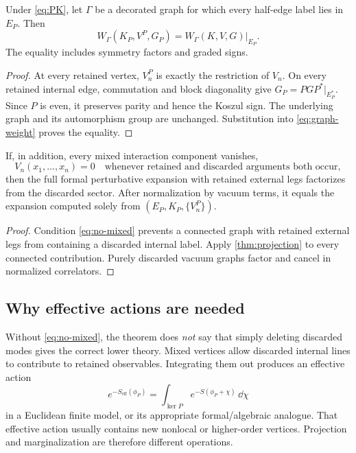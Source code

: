 \documentclass[11pt,a4paper]{article}
\begin{document}
\begin{theorem}
\label{thm:projection}
Under \eqref{eq:PK}, let \(\Gamma\) be a decorated graph for which every
half-edge label lies in \(E_P\).  Then
\[
 W_\Gamma(K_P,V^P,G_P)
 =
 W_\Gamma(K,V,G)\big|_{E_P}.
\]
The equality includes symmetry factors and graded signs.
\end{theorem}

\begin{proof}
At every retained vertex, \(V_n^P\) is exactly the restriction of \(V_n\).
On every retained internal edge, commutation and block diagonality give
\(G_P=PGP^*|_{E_P^*}\). Since \(P\) is even, it preserves parity and hence
the Koszul sign.  The underlying graph and its automorphism group are
unchanged.  Substitution into \eqref{eq:graph-weight} proves the equality.
\end{proof}

\begin{corollary}
\label{cor:closed-sector}
If, in addition, every mixed interaction component vanishes,
\[
 V_n(x_1,\ldots,x_n)=0
 \quad\text{whenever retained and discarded arguments both occur},
 \label{eq:no-mixed}
\]
then the full formal perturbative expansion with retained external legs
factorizes from the discarded sector.  After normalization by vacuum
terms, it equals the expansion computed solely from
\((E_P,K_P,\{V_n^P\})\).
\end{corollary}

\begin{proof}
Condition \eqref{eq:no-mixed} prevents a connected graph with retained
external legs from containing a discarded internal label.  Apply
\cref{thm:projection} to every connected contribution.  Purely discarded
vacuum graphs factor and cancel in normalized correlators.
\end{proof}

\subsection{Why effective actions are needed}

Without \eqref{eq:no-mixed}, the theorem does \emph{not} say that simply
deleting discarded modes gives the correct lower theory.  Mixed vertices
allow discarded internal lines to contribute to retained observables.
Integrating them out produces an effective action
\[
 e^{-S_{\mathrm{eff}}(\phi_P)}
 =
 \int_{\ker P}e^{-S(\phi_P+\chi)}\,\dd\chi
\]
in a Euclidean finite model, or its appropriate formal/algebraic analogue.
That effective action usually contains new nonlocal or higher-order
vertices.  Projection and marginalization are therefore different
operations.
\end{document}
